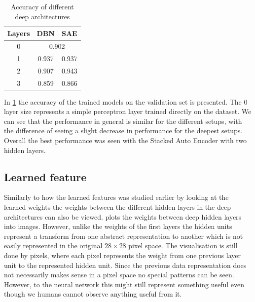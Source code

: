 \documentclass{article}
\begin{document}
\begin{table}[!ht]
  \centering
  \caption{Accuracy of different deep architectures}
  \label{tab:accuracy}
  \begin{tabular}{ccc}
    Layers & DBN & SAE \\ \midrule
    0 & \multicolumn{2}{c}{0.902} \\
    1 & 0.937 & 0.937 \\
    2 & 0.907 & 0.943 \\
    3 & 0.859 & 0.866
  \end{tabular}
\end{table}

In \cref{tab:accuracy} the accuracy of the trained models on the validation set is presented.
The 0 layer size represents a simple perceptron layer trained directly on the dataset.
We can see that the performance in general is similar for the different setups,
with the difference of seeing a slight decrease in performance for the deepest setups.
Overall the best performance was seen with the Stacked Auto Encoder with two hidden layers.

\subsection{Learned feature}
Similarly to how the learned features was studied earlier by looking at the learned weights
the weights between the different hidden layers in the deep architectures can also be viewed.
 plots the weights between deep hidden layers into images.
However, unlike the weights of the first layers the hidden units represent a transform
from one abstract representation to another
which is not easily represented in the original $28 \times 28$ pixel space.
The visualisation is still done by pixels,
where each pixel represents the weight from one previous layer unit to the represented hidden unit. Since the previous data representation does not necessarily makes sense in a pixel space
no special patterns can be seen.
However, to the neural network this might still represent something useful
even though we humans cannot observe anything useful from it.
\end{document}
